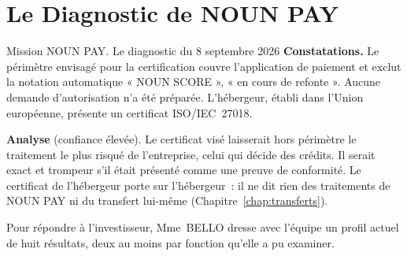 \section{Le Diagnostic de NOUN PAY}
\label{sec:c05-cas}

\begin{boxscenario}{Mission NOUN PAY. Le diagnostic du 8 septembre 2026}
\textbf{Constatations.} Le périmètre envisagé pour la certification couvre
l'application de paiement et exclut la notation automatique « NOUN SCORE »,
« en cours de refonte ». Aucune demande d'autorisation n'a été préparée.
L'hébergeur, établi dans l'Union européenne, présente un certificat
ISO/IEC~27018.

\textbf{Analyse} (confiance élevée). Le certificat visé laisserait hors
périmètre le traitement le plus risqué de l'entreprise, celui qui
décide des crédits. Il serait exact et trompeur s'il était présenté comme
une preuve de conformité. Le certificat de l'hébergeur porte sur
l'hébergeur~: il ne dit rien des traitements de NOUN PAY ni du transfert
lui-même (Chapitre~\ref{chap:transferts}).
\end{boxscenario}

Pour répondre à l'investisseur, Mme~BELLO dresse avec l'équipe un profil
actuel de huit résultats, deux au moins par fonction qu'elle a pu examiner.

